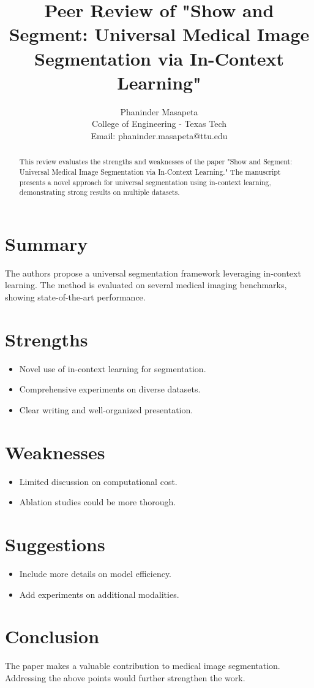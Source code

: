 \documentclass[conference]{IEEEtran}
\title{Peer Review of "Show and Segment: Universal Medical Image Segmentation via In-Context Learning"}
\author{
    Phaninder Masapeta \\
    College of Engineering - Texas Tech\\
    Email: phaninder.masapeta@ttu.edu
}
\begin{document}
\maketitle

\begin{abstract}
This review evaluates the strengths and weaknesses of the paper "Show and Segment: Universal Medical Image Segmentation via In-Context Learning." The manuscript presents a novel approach for universal segmentation using in-context learning, demonstrating strong results on multiple datasets.
\end{abstract}

\section*{Summary}
The authors propose a universal segmentation framework leveraging in-context learning. The method is evaluated on several medical imaging benchmarks, showing state-of-the-art performance.

\section*{Strengths}
\begin{itemize}
    \item Novel use of in-context learning for segmentation.
    \item Comprehensive experiments on diverse datasets.
    \item Clear writing and well-organized presentation.
\end{itemize}

\section*{Weaknesses}
\begin{itemize}
    \item Limited discussion on computational cost.
    \item Ablation studies could be more thorough.
\end{itemize}

\section*{Suggestions}
\begin{itemize}
    \item Include more details on model efficiency.
    \item Add experiments on additional modalities.
\end{itemize}

\section*{Conclusion}
The paper makes a valuable contribution to medical image segmentation. Addressing the above points would further strengthen the work.



\end{document}
